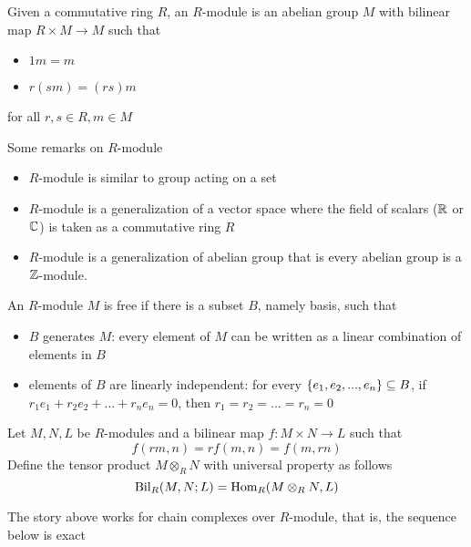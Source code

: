 \documentclass{report}
\begin{document}
\begin{definition}[$R$-module]
    Given a commutative ring $R$, an $R$-module is an abelian group $M$ with bilinear map $R \times M \to M$ such that
    \begin{itemize}
        \item $1 m = m$
        \item $r (s m) = (r s) m$
    \end{itemize}
    for all $r, s \in R, m \in M$
\end{definition}

\begin{remark}
    Some remarks on $R$-module
    \begin{itemize}
        \item $R$-module is similar to group acting on a set
        \item $R$-module is a generalization of a vector space where the field of scalars ($\mathbb{R}$ or $\mathbb{C}$) is taken as a commutative ring $R$
        \item $R$-module is a generalization of abelian group that is every abelian group is a $\mathbb{Z}$-module.
    \end{itemize}
\end{remark}

\begin{definition}
    An $R$-module $M$ is free if there is a subset $B$, namely basis, such that
    \begin{itemize}
        \item $B$ generates $M$: every element of $M$ can be written as a linear combination of elements in $B$
        \item elements of $B$ are linearly independent: for every $\{e_1, e_2, ..., e_n\} \subseteq B$, if $r_1 e_1 + r_2 e_2 + ... + r_n e_n = 0$, then $r_1 = r_2 = ... = r_n = 0$
    \end{itemize}
\end{definition}

\begin{definition}
    Let $M, N, L$ be $R$-modules and a bilinear map $f: M \times N \to L$ such that
    $$
        f(rm, n) = r f(m, n) = f(m, rn)
    $$
    Define the tensor product $M \otimes_R N$ with universal property as follows
    $$
        \operatorname{Bil}_R(M, N; L) = \operatorname{Hom}_R(M \otimes_R N, L)
    $$
\end{definition}

The story above works for chain complexes over $R$-module, that is, the sequence below is exact
\begin{center}
\end{center}
\end{document}

